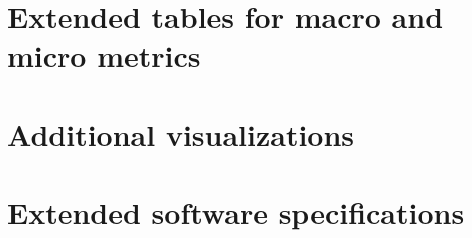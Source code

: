\documentclass[11pt,a4paper]{report}
\begin{document}
\renewcommand{\bibname}{References / Bibliography}
{}



\appendix
\chapter{Extended tables for macro and micro metrics}

\chapter{Additional visualizations}

\chapter{Extended software specifications}
\end{document}
